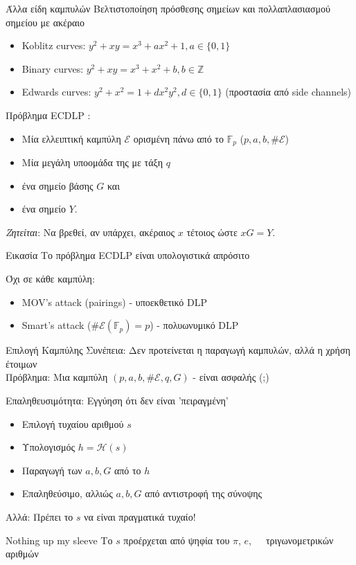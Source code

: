 \documentclass[handout]{beamer}
\begin{document}
\begin{frame}{Άλλα είδη καμπυλών}
	Βελτιστοποίηση πρόσθεσης σημείων και πολλαπλασιασμού σημείου με ακέραιο
	\begin{itemize}
		\item Koblitz curves: $y^2 +xy = x^3 +ax^2+1, a \in \{ 0,1 \}$
		\item Binary curves: $y^2 +xy = x^3 +x^2+b, b \in \mathbb{Z}$
		\item Edwards curves:  $y^2 +x^2 = 1+dx^2y^2, d \in \{ 0,1 \}$ (προστασία από side channels)
	\end{itemize}
\end{frame}

\begin{frame}{Πρόβλημα ECDLP}
: 

\begin{itemize}
\item Μία ελλειπτική καμπύλη $\mathcal E$ ορισμένη πάνω από το $\mathbb{F}_p$ ($p,a,b,\# \mathcal E$)
\item Μία μεγάλη υποομάδα της με τάξη $q$ 
\item ένα σημείο βάσης $G$  και  
\item ένα σημείο  $Y$. 
\end{itemize}
\alert{\emph{Ζητείται}}:
Να βρεθεί, αν υπάρχει, ακέραιος $x$ τέτοιος ώστε $xG=Y$.

\pause
\begin{block}{Εικασία}
Το πρόβλημα ECDLP είναι υπολογιστικά απρόσιτο
\end{block}
\pause
\alert{Όχι σε κάθε καμπύλη}: 
\begin{itemize}
	\item MOV's attack (pairings) - υποεκθετικό DLP
	\item Smart's attack ($\#\mathcal{E}(\mathbb{F}_p)=p$) - πολυωνυμικό DLP
\end{itemize} 
\end{frame}


\begin{frame}{Επιλογή Καμπύλης}
	Συνέπεια: Δεν προτείνεται η παραγωγή καμπυλών, αλλά η χρήση έτοιμων\\
	\pause
	\alert{Πρόβλημα:} Μια καμπύλη $(p,a,b,\# \mathcal{E},q,G)$ - είναι ασφαλής (;)
	\pause
	\begin{block}{Επαληθευσιμότητα: Εγγύηση ότι δεν είναι 'πειραγμένη'}
	\begin{itemize}
	\item Επιλογή τυχαίου αριθμού $s$
	\item Υπολογισμός $h=\mathcal{H}(s)$
	\item Παραγωγή των $a,b,G$ από το $h$
	\item Επαληθεύσιμο, αλλιώς $a,b,G$ από αντιστροφή της σύνοψης
	\end{itemize}
	\end{block}
	\pause
	\alert{Αλλά:} Πρέπει το $s$ να είναι πραγματικά τυχαίο!
	\begin{block}{Nothing up my sleeve}
	Το $s$ προέρχεται από ψηφία του $\pi$, $e, \quad$ τριγωνομετρικών αριθμών
	\end{block}
\end{frame}
\end{document}
